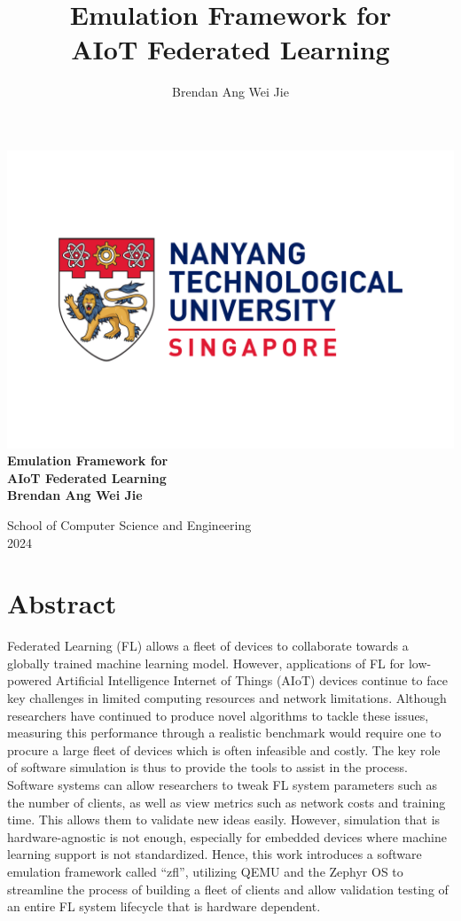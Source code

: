 \documentclass[12pt]{article}
\title{Emulation Framework for\protect\\ AIoT Federated Learning}
\author{Brendan Ang Wei Jie}
\begin{document}
\begin{titlepage}
  \begin{center}
    \includegraphics[width=\linewidth]{ntu} %
    \vfill
    {\bfseries\Large
        Emulation Framework for\protect\\ AIoT Federated Learning\\
        \vskip2cm
        Brendan Ang Wei Jie\\
    }
  \end{center}
    \vfill
    \vfill
    School of Computer Science and Engineering\\
    2024
    \vfill
\end{titlepage}

\pagebreak
\section{Abstract}
Federated Learning (FL) allows a fleet of devices to collaborate towards a globally trained machine
learning model. However, applications of FL for low-powered Artificial Intelligence Internet of Things (AIoT)
devices continue to face key challenges in limited computing resources and network limitations. Although
researchers have continued to produce novel algorithms to tackle these issues, measuring this performance through a realistic benchmark would require
one to procure a large fleet of devices which is often infeasible and costly. The key role
of software simulation is thus to provide the tools to assist in the process. Software systems can allow
researchers to tweak FL system parameters such as the number of clients, as well as view metrics such
as network costs and training time. This allows them to validate new ideas easily. However,
simulation that is hardware-agnostic is not enough, especially for embedded devices where machine
learning support is not standardized. Hence, this work introduces a software emulation framework
called ``zfl'', utilizing QEMU
and the Zephyr OS to streamline the process of building a fleet of clients and allow validation
testing of an entire FL system lifecycle that is hardware dependent.
\end{document}
